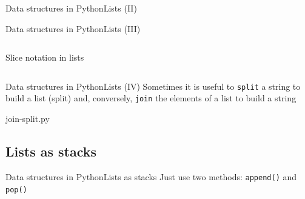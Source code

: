 \documentclass[10pt,compress]{beamer} %
\begin{document}
{\begin{frame}[fragile]{Data structures in Python}{Lists (II)}
		\begin{exampleblock}{}
		\vspace{-0.4cm}
		
		\vspace{-0.2cm}
		\end{exampleblock}
\end{frame}

\begin{frame}[fragile]{Data structures in Python}{Lists (III)}
    \begin{columns}
 	   \column{.50\textwidth}
		\begin{exampleblock}{Slice notation in lists}
		\vspace{-0.4cm}
		
		\vspace{-0.2cm}
		\end{exampleblock}
   \end{columns}
\end{frame}

\begin{frame}[fragile]{Data structures in Python}{Lists (IV)}
Sometimes it is useful to \texttt{split} a string to build a list (split) and, conversely, \texttt{join} the elements of a list to build a string
\scriptsize{
		\begin{exampleblock}{join-split.py}
		
		\end{exampleblock}
		}
\end{frame}


\subsection{Lists as stacks}
\begin{frame}[fragile]{Data structures in Python}{Lists as stacks}
	Just use two methods: \texttt{append()} and \texttt{pop()}
    
    \begin{columns}
\scriptsize{
		\begin{exampleblock}{}
		\vspace{-0.4cm}
		
		\vspace{-0.2cm}
		\end{exampleblock}
		}
    \end{columns}
\end{frame}

}
\end{document}
